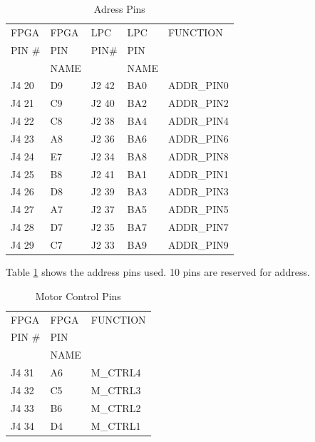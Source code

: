 \begin{table}[H]
\begin{center}
\caption{Adress Pins}
\begin{tabular}{|l|l||l|l||l|}
\hline FPGA & FPGA & LPC & LPC & FUNCTION \\ 
PIN \# & PIN & PIN\# & PIN & \\
 & NAME &  & NAME & \\
\hline J4 20 & D9 & J2 42 & BA0 & ADDR\_PIN0 \\ 
\hline J4 21 & C9 & J2 40 & BA2 & ADDR\_PIN2 \\ 
\hline J4 22 & C8 & J2 38 & BA4 & ADDR\_PIN4 \\ 
\hline J4 23 & A8 & J2 36 & BA6 & ADDR\_PIN6 \\ 
\hline J4 24 & E7 & J2 34 & BA8 & ADDR\_PIN8 \\ 
\hline J4 25 & B8 & J2 41 & BA1 & ADDR\_PIN1 \\ 
\hline J4 26 & D8 & J2 39 & BA3 & ADDR\_PIN3 \\ 
\hline J4 27 & A7 & J2 37 & BA5 & ADDR\_PIN5 \\ 
\hline J4 28 & D7 & J2 35 & BA7 & ADDR\_PIN7 \\ 
\hline J4 29 & C7 & J2 33 & BA9 & ADDR\_PIN9 \\ 
\hline 
\end{tabular} 
\label{table:addrtab} %
\end{center}
\end{table}

Table \ref{table:addrtab} shows the address pins used. 10 pins are reserved for address. 


\begin{table}[H]
\begin{center}
\caption{Motor Control Pins}
\begin{tabular}{|l|l||l|}
\hline FPGA & FPGA &  FUNCTION \\ 
PIN \# & PIN & \\
 & NAME & \\
\hline J4 31 & A6 & M\_CTRL4 \\ 
\hline J4 32 & C5 & M\_CTRL3 \\ 
\hline J4 33 & B6 & M\_CTRL2 \\ 
\hline J4 34 & D4 & M\_CTRL1 \\ 
\hline 
\end{tabular} 
\label{table:mctrltab} %
\end{center}
\end{table}

